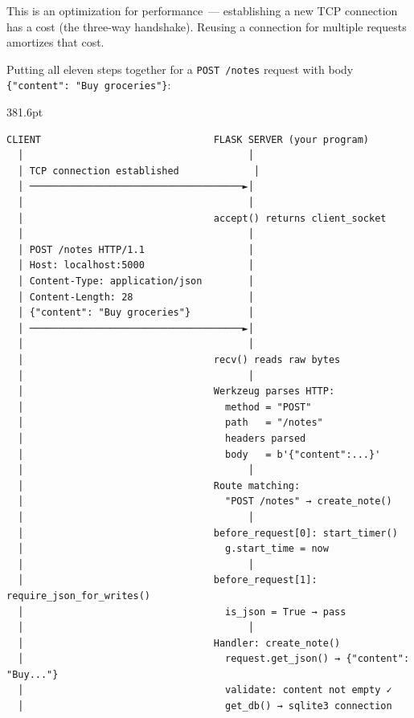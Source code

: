 This is an optimization for performance~--- establishing a new TCP connection has a cost (the three-way handshake). Reusing a connection for multiple requests amortizes that cost.

\label{05-internal-request-execution:the-complete-request-execution-sequence}

Putting all eleven steps together for a \texttt{POST\ /notes} request with body \texttt{\{"content":}\allowbreak{}\texttt{\ "Buy\ groceries"\}}:

\begin{diagrambox}{381.6pt}
\begin{Verbatim}[fontsize=\fontsize{9.0}{8.55}\selectfont]
CLIENT                              FLASK SERVER (your program)
  │                                       │
  │ TCP connection established             │
  │ ─────────────────────────────────────►│
  │                                       │
  │                                 accept() returns client_socket
  │                                       │
  │ POST /notes HTTP/1.1                  │
  │ Host: localhost:5000                  │
  │ Content-Type: application/json        │
  │ Content-Length: 28                    │
  │ {"content": "Buy groceries"}          │
  │ ─────────────────────────────────────►│
  │                                       │
  │                                 recv() reads raw bytes
  │                                       │
  │                                 Werkzeug parses HTTP:
  │                                   method = "POST"
  │                                   path   = "/notes"
  │                                   headers parsed
  │                                   body   = b'{"content":...}'
  │                                       │
  │                                 Route matching:
  │                                   "POST /notes" → create_note()
  │                                       │
  │                                 before_request[0]: start_timer()
  │                                   g.start_time = now
  │                                       │
  │                                 before_request[1]: require_json_for_writes()
  │                                   is_json = True → pass
  │                                       │
  │                                 Handler: create_note()
  │                                   request.get_json() → {"content": "Buy..."}
  │                                   validate: content not empty ✓
  │                                   get_db() → sqlite3 connection

\end{Verbatim}
\end{diagrambox}
